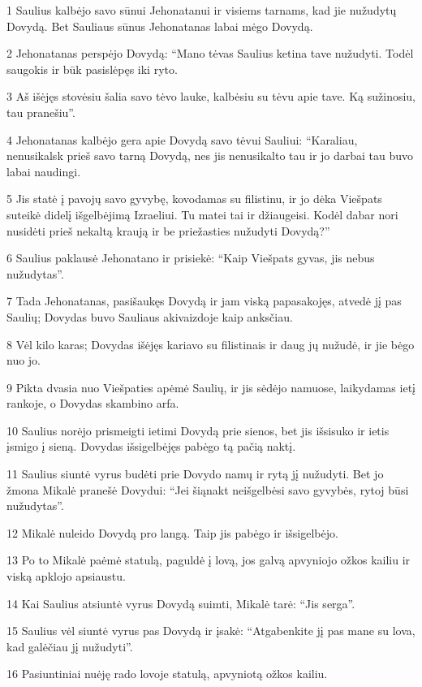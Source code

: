 \par 1 Saulius kalbėjo savo sūnui Jehonatanui ir visiems tarnams, kad jie nužudytų Dovydą. Bet Sauliaus sūnus Jehonatanas labai mėgo Dovydą. 
\par 2 Jehonatanas perspėjo Dovydą: “Mano tėvas Saulius ketina tave nužudyti. Todėl saugokis ir būk pasislėpęs iki ryto. 
\par 3 Aš išėjęs stovėsiu šalia savo tėvo lauke, kalbėsiu su tėvu apie tave. Ką sužinosiu, tau pranešiu”. 
\par 4 Jehonatanas kalbėjo gera apie Dovydą savo tėvui Sauliui: “Karaliau, nenusikalsk prieš savo tarną Dovydą, nes jis nenusikalto tau ir jo darbai tau buvo labai naudingi. 
\par 5 Jis statė į pavojų savo gyvybę, kovodamas su filistinu, ir jo dėka Viešpats suteikė didelį išgelbėjimą Izraeliui. Tu matei tai ir džiaugeisi. Kodėl dabar nori nusidėti prieš nekaltą kraują ir be priežasties nužudyti Dovydą?” 
\par 6 Saulius paklausė Jehonatano ir prisiekė: “Kaip Viešpats gyvas, jis nebus nužudytas”. 
\par 7 Tada Jehonatanas, pasišaukęs Dovydą ir jam viską papasakojęs, atvedė jį pas Saulių; Dovydas buvo Sauliaus akivaizdoje kaip anksčiau. 
\par 8 Vėl kilo karas; Dovydas išėjęs kariavo su filistinais ir daug jų nužudė, ir jie bėgo nuo jo. 
\par 9 Pikta dvasia nuo Viešpaties apėmė Saulių, ir jis sėdėjo namuose, laikydamas ietį rankoje, o Dovydas skambino arfa. 
\par 10 Saulius norėjo prismeigti ietimi Dovydą prie sienos, bet jis išsisuko ir ietis įsmigo į sieną. Dovydas išsigelbėjęs pabėgo tą pačią naktį. 
\par 11 Saulius siuntė vyrus budėti prie Dovydo namų ir rytą jį nužudyti. Bet jo žmona Mikalė pranešė Dovydui: “Jei šiąnakt neišgelbėsi savo gyvybės, rytoj būsi nužudytas”. 
\par 12 Mikalė nuleido Dovydą pro langą. Taip jis pabėgo ir išsigelbėjo. 
\par 13 Po to Mikalė paėmė statulą, paguldė į lovą, jos galvą apvyniojo ožkos kailiu ir viską apklojo apsiaustu. 
\par 14 Kai Saulius atsiuntė vyrus Dovydą suimti, Mikalė tarė: “Jis serga”. 
\par 15 Saulius vėl siuntė vyrus pas Dovydą ir įsakė: “Atgabenkite jį pas mane su lova, kad galėčiau jį nužudyti”. 
\par 16 Pasiuntiniai nuėję rado lovoje statulą, apvyniotą ožkos kailiu. 
